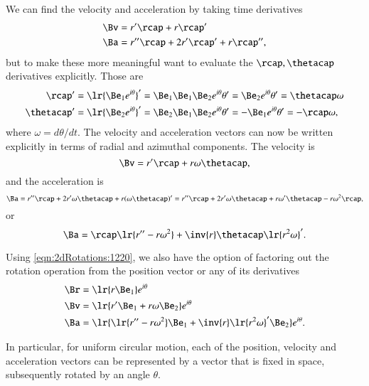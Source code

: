 {We can find the
velocity and acceleration by taking time derivatives
\begin{dmath}\label{eqn:2dRotations:1240}
\begin{aligned}
\Bv &= r' \rcap + r \rcap' \\
\Ba &= r'' \rcap + 2 r' \rcap' + r \rcap'',
\end{aligned}
\end{dmath}
but to make these more meaningful want to evaluate the \( \rcap, \thetacap \) derivatives explicitly.  Those are
\begin{equation}\label{eqn:2dRotations:1260}
\begin{aligned}
\rcap' &= \lr{ \Be_1 e^{i \theta} }' = \Be_1 \Be_1 \Be_2 e^{i\theta} \theta' = \Be_2 e^{i\theta} \theta' = \thetacap \omega \\
\thetacap' &= \lr{ \Be_2 e^{i \theta} }' = \Be_2 \Be_1 \Be_2 e^{i\theta} \theta' = -\Be_1 e^{i\theta} \theta' = -\rcap \omega,
\end{aligned}
\end{equation}
where \( \omega = d\theta/dt \).  The velocity and acceleration vectors can now be written explicitly in terms of radial and azimuthal components.  The velocity is
\begin{dmath}\label{eqn:2dRotations:1280}
\Bv = r' \rcap + r \omega \thetacap,
\end{dmath}
and the acceleration is
\begin{dmath}\label{eqn:2dRotations:1300}
\Ba
= r'' \rcap + 2 r' \omega \thetacap + r (\omega \thetacap)'
= r'' \rcap + 2 r' \omega \thetacap + r \omega' \thetacap - r \omega^2 \rcap,
\end{dmath}
or
\begin{dmath}\label{eqn:2dRotations:1320}
\Ba
= \rcap \lr{ r'' - r \omega^2 }
+ \inv{r} \thetacap \lr{ r^2 \omega }'.
\end{dmath}

Using \cref{eqn:2dRotations:1220}, we also have the option of factoring out the rotation operation from the position vector or any of its derivatives
\begin{dmath}\label{eqn:2dRotations:1360}
\begin{aligned}
\Br &= \lr{ r \Be_1 } e^{i \theta } \\
\Bv &= \lr{ r' \Be_1 + r \omega \Be_2 } e^{i \theta } \\
\Ba &= \lr{ \lr{ r'' - r \omega^2 } \Be_1 + \inv{r} \lr{ r^2 \omega }' \Be_2 } e^{i\theta}.
\end{aligned}
\end{dmath}

In particular,
for uniform circular motion, each of the position, velocity and acceleration vectors can be represented by a vector that is fixed in space, subsequently rotated by an angle \( \theta \).
} %

